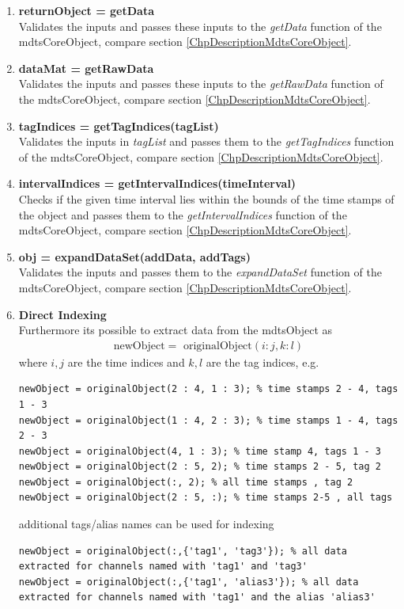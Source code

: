 \documentclass[a4]{scrreprt}
\begin{document}
\begin{enumerate}
	
\item \textbf{returnObject = getData}\\
	Validates the inputs and passes these inputs to the \textit{getData} function of the mdtsCoreObject, compare section \ref{ChpDescriptionMdtsCoreObject}.
	
\item \textbf{dataMat = getRawData}\\
Validates the inputs and passes these inputs to the \textit{getRawData} function of the mdtsCoreObject, compare section \ref{ChpDescriptionMdtsCoreObject}.
	
\item \textbf{tagIndices = getTagIndices(tagList)}\\
	Validates the inputs in \textit{tagList} and passes them to the \textit{getTagIndices} function of the mdtsCoreObject, compare section \ref{ChpDescriptionMdtsCoreObject}.
	
\item \textbf{intervalIndices = getIntervalIndices(timeInterval)}\\
	Checks if the given time interval lies within the bounds of the time stamps of the object and passes them to the \textit{getIntervalIndices} function of the mdtsCoreObject, compare section \ref{ChpDescriptionMdtsCoreObject}.
	
\item \textbf{obj = expandDataSet(addData, addTags)}\\
	Validates the inputs and passes them to the \textit{expandDataSet} function of the mdtsCoreObject, compare section \ref{ChpDescriptionMdtsCoreObject}.
	
\item \textbf{Direct Indexing}\\
Furthermore its possible to extract data from the mdtsObject as 
\begin{align*}
\text{newObject} = \text{ originalObject}(i : j, k : l)
\end{align*}
where $i, j$ are the time indices and $k, l$ are the tag indices, e.g.
\begin{lstlisting}[frame=single]
newObject = originalObject(2 : 4, 1 : 3); % time stamps 2 - 4, tags 1 - 3
newObject = originalObject(1 : 4, 2 : 3); % time stamps 1 - 4, tags 2 - 3
newObject = originalObject(4, 1 : 3); % time stamp 4, tags 1 - 3
newObject = originalObject(2 : 5, 2); % time stamps 2 - 5, tag 2
newObject = originalObject(:, 2); % all time stamps , tag 2
newObject = originalObject(2 : 5, :); % time stamps 2-5 , all tags
\end{lstlisting}
additional tags/alias names can be used for indexing
\begin{lstlisting}[frame=single]
newObject = originalObject(:,{'tag1', 'tag3'}); % all data extracted for channels named with 'tag1' and 'tag3'
newObject = originalObject(:,{'tag1', 'alias3'}); % all data extracted for channels named with 'tag1' and the alias 'alias3'
\end{lstlisting}


\end{enumerate}
\end{document}
